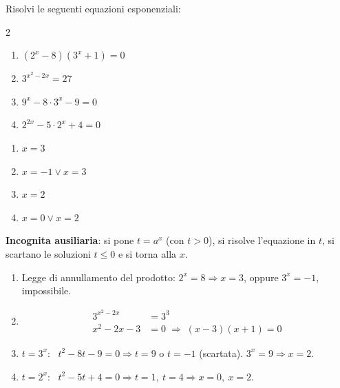 \begin{question}[ID=3.5, subtitle={Legge di annullamento del prodotto e incognita ausiliaria}, difficulty=difficile, tags={equazioni, esponenziali, sostituzione}]
Risolvi le seguenti equazioni esponenziali:
\begin{center}\begin{minipage}{0.92\linewidth}
\begin{multicols}{2}
\begin{enumerate}[leftmargin=3.2cm]
\item $(2^{x} - 8)(3^{x} + 1) = 0$
\item $3^{x^2-2x} = 27$
\item $9^{x} - 8 \cdot 3^{x} - 9 = 0$
\item $2^{2x} - 5 \cdot 2^{x} + 4 = 0$
\end{enumerate}
\end{multicols}
\end{minipage}\end{center}
\begin{solution}
\begin{enumerate}
    \item $x=3$
    \item $x=-1\vee x=3$
    \item $x=2$
    \item $x=0\vee x=2$
\end{enumerate}
\end{solution}
\begin{explanation}
\textbf{Incognita ausiliaria}: si pone $t=a^x$ (con $t>0$), si risolve l'equazione in $t$, si scartano le soluzioni $t\leq0$ e si torna alla $x$.
\begin{enumerate}
    \item Legge di annullamento del prodotto: $2^x=8 \Rightarrow x=3$, oppure $3^x=-1$, impossibile.
    \item \[\begin{aligned}
    3^{x^2-2x} &= 3^3\\
    x^2-2x-3 &= 0 \;\Rightarrow\; (x-3)(x+1)=0
    \end{aligned}\]
    \item $t=3^x$: \ $t^2-8t-9=0 \Rightarrow t=9$ o $t=-1$ (scartata). $3^x=9 \Rightarrow x=2$.
    \item $t=2^x$: \ $t^2-5t+4=0 \Rightarrow t=1,\ t=4 \Rightarrow x=0,\ x=2$.
\end{enumerate}
\end{explanation}
\end{question}

